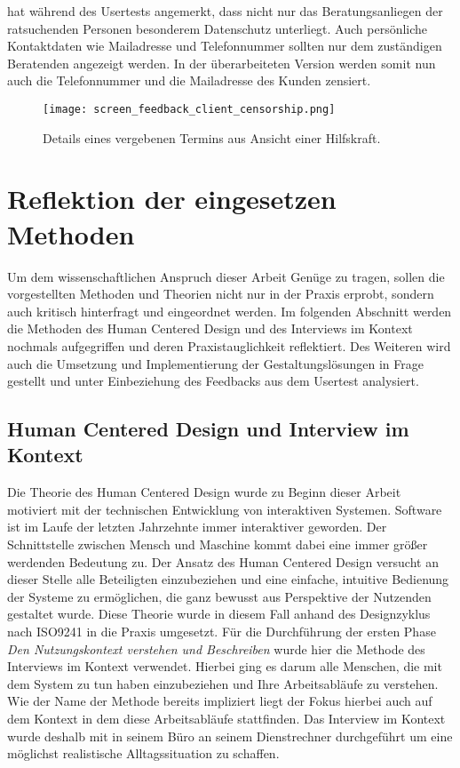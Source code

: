\ipName hat während des Usertests angemerkt, dass nicht nur das Beratungsanliegen der ratsuchenden Personen besonderem Datenschutz unterliegt. Auch persönliche Kontaktdaten wie Mailadresse und Telefonnummer sollten nur dem zuständigen Beratenden angezeigt werden. In der überarbeiteten Version werden somit nun auch die Telefonnummer und die Mailadresse des Kunden zensiert.

\begin{figure}[H]
    \caption{Details eines vergebenen Termins aus Ansicht einer Hilfskraft.}
    \centering
    \texttt{[image: screen\_feedback\_client\_censorship.png]}
\end{figure}

\section{Reflektion der eingesetzen Methoden}
\label{subsection:reflection}

Um dem wissenschaftlichen Anspruch dieser Arbeit Genüge zu tragen, sollen die
vorgestellten Methoden und Theorien nicht nur in der Praxis erprobt, sondern
auch kritisch hinterfragt und eingeordnet werden. Im folgenden Abschnitt werden
die Methoden des Human Centered Design und des Interviews im Kontext nochmals
aufgegriffen und deren Praxistauglichkeit reflektiert. Des Weiteren wird auch
die Umsetzung und Implementierung der Gestaltungslösungen in Frage gestellt und
unter Einbeziehung des Feedbacks aus dem Usertest analysiert.

\subsection*{Human Centered Design und Interview im Kontext}
Die Theorie des Human Centered Design wurde zu Beginn dieser Arbeit motiviert
mit der technischen Entwicklung von interaktiven Systemen. Software ist im
Laufe der letzten Jahrzehnte immer interaktiver geworden. Der Schnittstelle
zwischen Mensch und Maschine kommt dabei eine immer größer werdenden Bedeutung
zu\cite{hci}. Der Ansatz des Human Centered Design versucht an dieser Stelle
alle Beteiligten einzubeziehen und eine einfache, intuitive Bedienung der
Systeme zu ermöglichen, die ganz bewusst aus Perspektive der Nutzenden
gestaltet wurde\cite{sequenceDiagrams}. Diese Theorie wurde in diesem Fall
anhand des Designzyklus nach ISO9241 in die Praxis umgesetzt. Für die
Durchführung der ersten Phase \textit{Den Nutzungskontext verstehen und
    Beschreiben} wurde hier die Methode des Interviews im Kontext verwendet.
Hierbei ging es darum alle Menschen, die mit dem System zu tun haben
einzubeziehen und Ihre Arbeitsabläufe zu verstehen. Wie der Name der Methode
bereits impliziert liegt der Fokus hierbei auch auf dem Kontext in dem diese
Arbeitsabläufe stattfinden\cite{hciHandbook}. Das Interview im Kontext wurde
deshalb mit \ipName in seinem Büro an seinem Dienstrechner durchgeführt um eine
möglichst realistische Alltagssituation zu schaffen.

